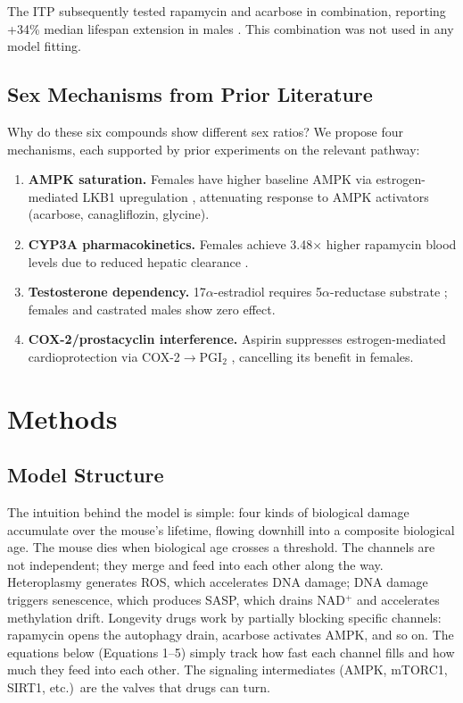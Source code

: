 \documentclass[11pt]{article}
\begin{document}
The ITP subsequently tested rapamycin and acarbose in combination, reporting +34\% median lifespan extension in males \citep{Strong2022}. This combination was not used in any model fitting.

\subsection{Sex Mechanisms from Prior Literature}

Why do these six compounds show different sex ratios? We propose four mechanisms, each supported by prior experiments on the relevant pathway:

\begin{enumerate}
\item \textbf{AMPK saturation.} Females have higher baseline AMPK via estrogen-mediated LKB1 upregulation \citep{Boudaba2018,McInnes2011}, attenuating response to AMPK activators (acarbose, canagliflozin, glycine).

\item \textbf{CYP3A pharmacokinetics.} Females achieve 3.48$\times$ higher rapamycin blood levels due to reduced hepatic clearance \citep{Lamming2014}.

\item \textbf{Testosterone dependency.} 17$\alpha$-estradiol requires 5$\alpha$-reductase substrate \citep{Garratt2018}; females and castrated males show zero effect.

\item \textbf{COX-2/prostacyclin interference.} Aspirin suppresses estrogen-mediated cardioprotection via COX-2$\to$PGI$_2$ \citep{Egan2004,Grosser2006}, cancelling its benefit in females.
\end{enumerate}

\section{Methods}

\subsection{Model Structure}

The intuition behind the model is simple: four kinds of biological damage accumulate over the mouse's lifetime, flowing downhill into a composite biological age. The mouse dies when biological age crosses a threshold. The channels are not independent; they merge and feed into each other along the way. Heteroplasmy generates ROS, which accelerates DNA damage; DNA damage triggers senescence, which produces SASP, which drains NAD$^+$ and accelerates methylation drift. Longevity drugs work by partially blocking specific channels: rapamycin opens the autophagy drain, acarbose activates AMPK, and so on. The equations below (Equations 1--5) simply track how fast each channel fills and how much they feed into each other. The signaling intermediates (AMPK, mTORC1, SIRT1, etc.)\ are the valves that drugs can turn.
\end{document}
